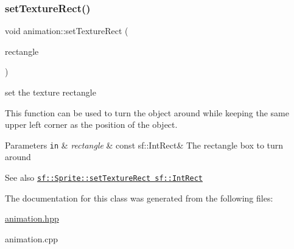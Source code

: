 \subsubsection{\texorpdfstring{set\+Texture\+Rect()}{setTextureRect()}}
{\footnotesize\ttfamily void animation\+::set\+Texture\+Rect (\begin{DoxyParamCaption}\item[{const sf\+::\+Int\+Rect \&}]{rectangle }\end{DoxyParamCaption})}



set the texture rectangle 

This function can be used to turn the object around while keeping the same upper left corner as the position of the object.


\begin{DoxyParams}[1]{Parameters}
\mbox{\tt in}  & {\em rectangle} & const sf\+::\+Int\+Rect\& The rectangle box to turn around \\
\hline
\end{DoxyParams}
\begin{DoxySeeAlso}{See also}
\href{https://www.sfml-dev.org/documentation/2.0/classsf_1_1Sprite.php#a3fefec419a4e6a90c0fd54c793d82ec2 }{\tt sf\+::\+Sprite\+::set\+Texture\+Rect sf\+::\+Int\+Rect} 
\end{DoxySeeAlso}


The documentation for this class was generated from the following files\+:\begin{DoxyCompactItemize}
\item 
\hyperlink{animation_8hpp}{animation.\+hpp}\item 
animation.\+cpp\end{DoxyCompactItemize}
